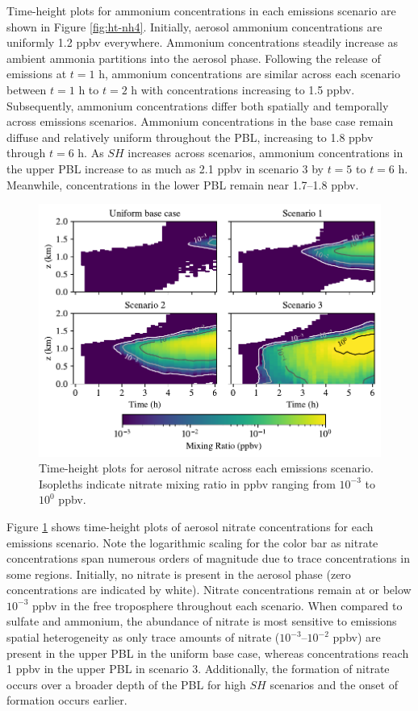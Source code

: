 Time-height plots for ammonium concentrations in each emissions scenario are shown in Figure \ref{fig:ht-nh4}. Initially, aerosol ammonium concentrations are uniformly 1.2 ppbv everywhere. Ammonium concentrations steadily increase as ambient ammonia partitions into the aerosol phase. Following the release of emissions at $t=1$ h, ammonium concentrations are similar across each scenario between $t=1$ h to $t=2$ h with concentrations increasing to 1.5 ppbv. Subsequently, ammonium concentrations differ both spatially and temporally across emissions scenarios. Ammonium concentrations in the base case remain diffuse and relatively uniform throughout the PBL, increasing to 1.8 ppbv through $t=6$ h. As $SH$ increases across scenarios, ammonium concentrations in the upper PBL increase to as much as 2.1 ppbv in scenario 3 by $t=5$ to $t=6$ h. Meanwhile, concentrations in the lower PBL remain near 1.7--1.8 ppbv.

\begin{figure}[!t]
  \centering
    \includegraphics[width=\textwidth]{figures/chapter5/height-time-pmc_NO3-four-scenarios.pdf}
    \caption{Time-height plots for aerosol nitrate across each emissions scenario. Isopleths indicate nitrate mixing ratio in ppbv ranging from $10^{-3}$ to $10^0$ ppbv.}
    \label{fig:ht-no3}
\end{figure}

Figure \ref{fig:ht-no3} shows time-height plots of aerosol nitrate concentrations for each emissions scenario. Note the logarithmic scaling for the color bar as nitrate concentrations span numerous orders of magnitude due to trace concentrations in some regions. Initially, no nitrate is present in the aerosol phase (zero concentrations are indicated by white). Nitrate concentrations remain at or below $10^{-3}$ ppbv in the free troposphere throughout each scenario. When compared to sulfate and ammonium, the abundance of nitrate is most sensitive to emissions spatial heterogeneity as only trace amounts of nitrate ($10^{-3}$--$10^{-2}$ ppbv) are present in the upper PBL in the uniform base case, whereas concentrations reach 1 ppbv in the upper PBL in scenario 3. Additionally, the formation of nitrate occurs over a broader depth of the PBL for high $SH$ scenarios and the onset of formation occurs earlier. 

